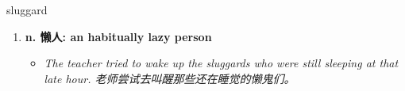 
\begin{frame}
{\huge sluggard}
\begin{center}
\begin{enumerate}\Large
  \item \textbf{n. 懒人: an habitually lazy person}
  \begin{itemize}
    \item \em{\Large{The teacher tried to wake up the sluggards who were still sleeping at that late hour. 老师尝试去叫醒那些还在睡觉的懒鬼们。}}
  \end{itemize}
\end{enumerate}
\end{center}
\end{frame}
